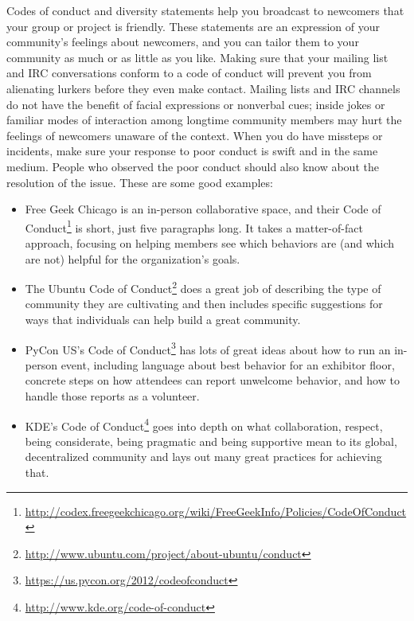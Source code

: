Codes of conduct and diversity statements help you broadcast to newcomers that your group or project is friendly. These statements are an expression of your community’s feelings about newcomers, and you can tailor them to your community as much or as little as you like. Making sure that your mailing list and IRC conversations conform to a code of conduct will prevent you from alienating lurkers before they even make contact. Mailing lists and IRC channels do not have the benefit of facial expressions or nonverbal cues; inside jokes or familiar modes of interaction among longtime community members may hurt the feelings of newcomers unaware of the context. When you do have missteps or incidents, make sure your response to poor conduct is swift and in the same medium. People who observed the poor conduct should also know about the resolution of the issue. These are some good examples:
\begin{itemize}
  \item Free Geek Chicago is an in-person collaborative space, and their Code of Conduct\footnote{\url{http://codex.freegeekchicago.org/wiki/FreeGeekInfo/Policies/CodeOfConduct}} is short, just five paragraphs long. It takes a matter-of-fact approach, focusing on helping members see which behaviors are (and which are not) helpful for the organization’s goals.
  \item The Ubuntu Code of Conduct\footnote{\url{http://www.ubuntu.com/project/about-ubuntu/conduct}} does a great job of describing the type of community they are cultivating and then includes specific suggestions for ways that individuals can help build a great community.
  \item PyCon US's Code of Conduct\footnote{\url{https://us.pycon.org/2012/codeofconduct}} has lots of great ideas about how to run an in-person event, including language about best behavior for an exhibitor floor, concrete steps on how attendees can report unwelcome behavior, and how to handle those reports as a volunteer.
  \item KDE’s Code of Conduct\footnote{\url{http://www.kde.org/code-of-conduct}} goes into depth on what collaboration, respect, being considerate, being pragmatic and being supportive mean to its global, decentralized community and lays out many great practices for achieving that.
\end{itemize}

